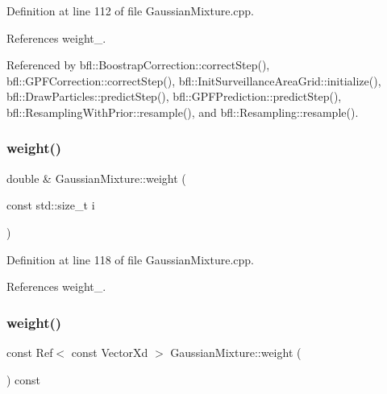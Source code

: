 Definition at line 112 of file Gaussian\+Mixture.\+cpp.



References weight\+\_\+.



Referenced by bfl\+::\+Boostrap\+Correction\+::correct\+Step(), bfl\+::\+G\+P\+F\+Correction\+::correct\+Step(), bfl\+::\+Init\+Surveillance\+Area\+Grid\+::initialize(), bfl\+::\+Draw\+Particles\+::predict\+Step(), bfl\+::\+G\+P\+F\+Prediction\+::predict\+Step(), bfl\+::\+Resampling\+With\+Prior\+::resample(), and bfl\+::\+Resampling\+::resample().

\mbox{\label{classbfl_1_1GaussianMixture_a44885fb208e33f37015d47f55d02ef50}} 
\subsubsection{\texorpdfstring{weight()}{weight()}\hspace{0.1cm}{\footnotesize\ttfamily [2/4]}}
{\footnotesize\ttfamily double \& Gaussian\+Mixture\+::weight (\begin{DoxyParamCaption}\item[{const std\+::size\+\_\+t}]{i }\end{DoxyParamCaption})}



Definition at line 118 of file Gaussian\+Mixture.\+cpp.



References weight\+\_\+.

\mbox{\label{classbfl_1_1GaussianMixture_a9ef04270bbccfe01f481665a1f390167}} 
\subsubsection{\texorpdfstring{weight()}{weight()}\hspace{0.1cm}{\footnotesize\ttfamily [3/4]}}
{\footnotesize\ttfamily const Ref$<$ const Vector\+Xd $>$ Gaussian\+Mixture\+::weight (\begin{DoxyParamCaption}{ }\end{DoxyParamCaption}) const}



